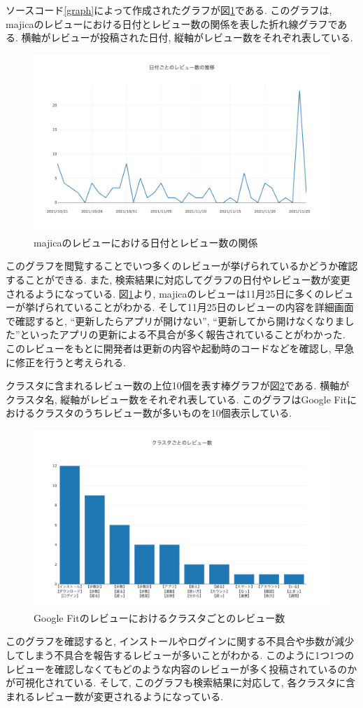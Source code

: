 ソースコード\ref{graph}によって作成されたグラフが図\ref{fig:majica_graph}である. このグラフは, majicaのレビューにおける日付とレビュー数の関係を表した折れ線グラフである. 
横軸がレビューが投稿された日付, 縦軸がレビュー数をそれぞれ表している. 

\begin{figure}[H]
  \centering
  \includegraphics[scale=0.4]
    {contents/images/majica_graph.png}
  \caption{majicaのレビューにおける日付とレビュー数の関係\label{fig:majica_graph}}
\end{figure}

このグラフを閲覧することでいつ多くのレビューが挙げられているかどうか確認することができる. また, 検索結果に対応してグラフの日付やレビュー数が変更されるようになっている. 
図\ref{fig:majica_graph}より, majicaのレビューは11月25日に多くのレビューが挙げられていることがわかる. そして11月25日のレビューの内容を詳細画面で確認すると, ``更新したらアプリが開けない'', ``更新してから開けなくなりました''といったアプリの更新による不具合が多く報告されていることがわかった. 
このレビューをもとに開発者は更新の内容や起動時のコードなどを確認し, 早急に修正を行うと考えられる. 

クラスタに含まれるレビュー数の上位10個を表す棒グラフが図\ref{fig:top10}である. 横軸がクラスタ名, 縦軸がレビュー数をそれぞれ表している. 
このグラフはGoogle Fitにおけるクラスタのうちレビュー数が多いものを10個表示している. 

\begin{figure}[H]
  \centering
  \includegraphics[scale=0.4]
    {contents/images/top10.png}
  \caption{Google Fitのレビューにおけるクラスタごとのレビュー数\label{fig:top10}}
\end{figure}

このグラフを確認すると, インストールやログインに関する不具合や歩数が減少してしまう不具合を報告するレビューが多いことがわかる. このように1つ1つのレビューを確認しなくてもどのような内容のレビューが多く投稿されているのかが可視化されている. 
そして, このグラフも検索結果に対応して, 各クラスタに含まれるレビュー数が変更されるようになっている. 

